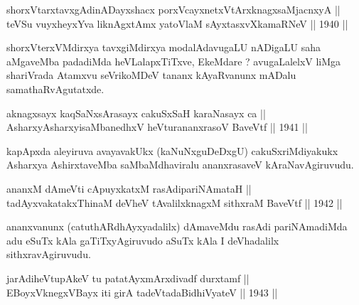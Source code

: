 
\begin{shl}
shorxVtarxtavxgAdinADayxshacx porxVcayxnetxV\s tArxknagxsaMjacnxyA || \\
teVSu vuyxheyxYva liknAgxtAmx yatoV\s laM sAyxtasxvXkamaRNeV \hfill || 1940 ||
  
\end{shl}

\begin{artha}
shorxVterxVMdirxya tavxgiMdirxya modalAdavugaLU nADigaLU saha aMgaveMba
padadiMda heVLalapxTiTxve, EkeMdare ? avugaLalelxV liMga shariVrada
Atamxvu seVrikoMDeV tananx kAyaRvanunx mADalu samathaRvAgutatxde.
\end{artha}


\begin{shl}
aknagxsayx kaqSaNxsArasayx cakuSxSaH karaNasayx ca || \\
AsharxyAsharxyisaMbanedhxV heVturananxrasoV BaveVtf \hfill || 1941 ||
  
\end{shl}

\begin{artha}
kapApxda aleyiruva avayavakUkx (kaNuNxguDeDxgU) cakuSxriMdiyakukx
Asharxya AshirxtaveMba saMbaMdhaviralu ananxrasaveV kAraNavAgiruvudu.
\end{artha}


\begin{shl}
ananxM dAmeVti cApuyxkatxM rasAdipariNAmataH || \\
tadAyxvakatakxThinaM deVheV tAvalilxknagxM sithxraM BaveVtf \hfill || 1942 ||
  
\end{shl}

\begin{artha}
ananxvanunx (catuthARdhAyxyadalilx) dAmaveMdu rasAdi pariNAmadiMda adu
eSuTx kAla gaTiTxyAgiruvudo aSuTx kAla I deVhadalilx sithxravAgiruvudu.
\end{artha}


\begin{shl}
jarAdiheVtupAkeV tu patatAyxmArxdivadf durxtamf || \\
EBoyxV\s knegxVBayx iti girA tadeVtadaBidhiVyateV \hfill || 1943 ||
  
\end{shl}

